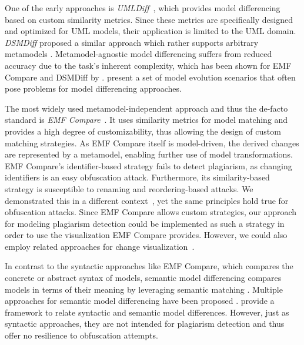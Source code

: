 One of the early approaches is \emph{UMLDiff}~\cite{Xing2005}, which provides model differencing based on custom similarity metrics. Since these metrics are specifically designed and optimized for UML models, their application is limited to the UML domain.
\emph{DSMDiff} proposed a similar approach which rather supports arbitrary metamodels \cite{lin2007}.
%
Metamodel-agnostic model differencing suffers from reduced accuracy due to the task's inherent complexity, which has been shown for EMF Compare and DSMDiff by \citet{Kolovos2009}. \citet{Pietsch2013} present a set of model evolution scenarios that often pose problems for model differencing approaches.

The most widely used metamodel-independent approach and thus the de-facto standard is \emph{EMF Compare}~\cite{Brun2008}.
It uses similarity metrics for model matching and provides a high degree of customizability, thus allowing the design of custom matching strategies. As EMF Compare itself is model-driven, the derived changes are represented by a metamodel, enabling further use of model transformations.
EMF Compare's identifier-based strategy fails to detect plagiarism, as changing identifiers is an easy obfuscation attack.
%
Furthermore, its similarity-based strategy is susceptible to renaming and reordering-based attacks.
We demonstrated this in a different context~\cite{Wittler2023}, yet the same principles hold true for obfuscation attacks.
Since EMF Compare allows custom strategies, our approach for modeling plagiarism detection could be implemented as such a strategy in order to use the visualization EMF Compare provides. However, we could also employ related approaches for change visualization~\cite{Brand2010, Brand2010b}.

In contrast to the syntactic approaches like EMF Compare, which compares the concrete or abstract syntax of models, semantic model differencing compares models in terms of their meaning by leveraging semantic matching \cite{Maoz2011, Maoz2016}. Multiple approaches for semantic model differencing have been proposed \cite{Langer2014, addazi2016}.
\citet{Maoz2016} provide a framework to relate syntactic and semantic model differences.
However, just as syntactic approaches, they are not intended for plagiarism detection and thus offer no resilience to obfuscation attempts.

